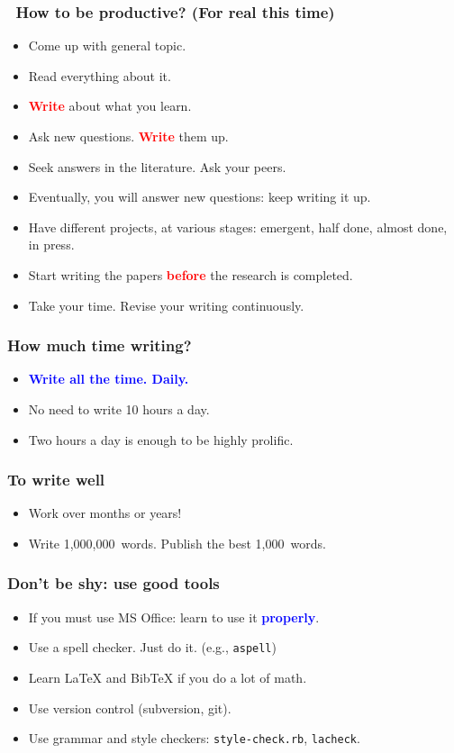 \documentclass[handout]{beamer}
\newcommand{\vimportant}[1]{\textcolor{red}{\textbf{#1}}}
\newcommand{\important}[1]{\textcolor{blue}{\textbf{#1}}}
\begin{document}
\frame
{
  \frametitle{ How to be productive? (For real this time)}
 \begin{itemize}
 \item<1-> Come up with general topic.
  \item<2-> Read everything about it.
  \item<3-> \vimportant{Write} about what you learn.
  \item<4-> Ask new questions. \vimportant{Write} them up.
  \item<5-> Seek answers in the literature. Ask your peers.
  \item<6-> Eventually, you will answer new questions: keep writing it up.
  \item<7-> Have different projects, at various stages: emergent, half done, almost done, in press.
  \item<8-> Start writing the papers \vimportant{before} the research is completed.
  \item<9-> Take your time.  Revise your writing continuously.
 \end{itemize}
}

\frame
{
  \frametitle{How much time writing?}
 \begin{itemize}
  \item<1-> \important{Write all the time. Daily.}
  \item<2-> No need to write 10 hours a day.
  \item<3-> Two hours a day is enough to be highly prolific.
 \end{itemize}
}





\frame
{
  \frametitle{To write well}

 \begin{itemize}
  \item<1->  Work over months or years!
 \item<2->  Write 1,000,000~words. Publish the best 1,000~words.
 \end{itemize}
 }
\frame
{
  \frametitle{Don't be shy: use good tools}

 \begin{itemize}
  \item<1-> If you must use MS Office: learn to use it \important{properly}.
 \item<2-> Use a spell checker. Just do it. (e.g., \texttt{aspell})
 \item<3-> Learn \LaTeX{} and BibTeX if you do a lot of math.
  \item<4-> Use version control (subversion, git).
  \item<5-> Use grammar and style checkers: \texttt{style-check.rb}, \texttt{lacheck}.
   \end{itemize}
 }
\end{document}
